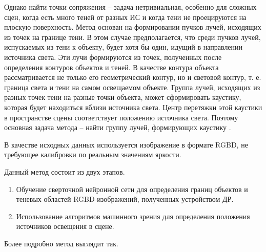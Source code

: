 Однако найти точки сопряжения -- задача нетривиальная, особенно для сложных сцен, когда есть много теней от разных ИС и когда тени не проецируются на плоскую поверхность. Метод основан на формировании пучков лучей, исходящих из точек на границе тени. В этом случае предполагается, что среди пучков лучей, испускаемых из тени к объекту, будет хотя бы один, идущий в направлении источника света. Эти лучи формируются из точек, полученных после определения контуров объектов и теней. В качестве контура объекта рассматривается не только его геометрический контур, но и световой контур, т. е. граница света и тени на самом освещаемом объекте. Группа лучей, исходящих из разных точек тени на разные точки объекта, может сформировать каустику, которая будет находиться вблизи источника света. Центр перетяжки этой каустики в пространстве сцены соответствует положению источника света. Поэтому основная задача метода -- найти группу лучей, формирующих каустику \cite{sns_tras}.

В качестве исходных данных используется изображение в формате RGBD, не требующее калибровки по реальным значениям яркости.

Данный метод состоит из двух этапов.
\begin{enumerate}
	\item Обучение сверточной нейронной сети для определения границ объектов и теневых областей RGBD-изображений, полученных устройством ДР.
	\item Использование алгоритмов машинного зрения для определения положения источников освещения в сцене.
\end{enumerate}

Более подробно метод выглядит так.

